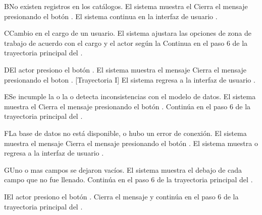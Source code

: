 \begin{UCtrayectoriaA}{B}{No existen registros en los catálogos.}
	\UCpaso     El sistema muestra el 
	\UCpaso[\UCactor] Cierra el mensaje presionando el botón .
	\UCpaso El sistema continua en la interfaz de usuario .
\end{UCtrayectoriaA}

\begin{UCtrayectoriaA}{C}{Cambio en el cargo de un usuario.}
	\UCpaso     El sistema ajustara las opciones de zona de trabajo de acuerdo con el cargo y el actor según la 
	\UCpaso     Continua en el paso 6 de la trayectoria principal del .
\end{UCtrayectoriaA}


\begin{UCtrayectoriaA}{D}{El actor presiono el botón .}
	\UCpaso El sistema muestra el mensaje 
	\UCpaso[\UCactor] Cierra el mensaje presionando el boton  . [Trayectoria I]
	\UCpaso El sistema regresa a la interfaz de usuario .
\end{UCtrayectoriaA}

\begin{UCtrayectoriaA}{E}{Se incumple la  o la   o detecta inconsistencias con el modelo de datos.}
	\UCpaso El sistema muestra el 
	\UCpaso[\UCactor] Cierra el mensaje presionando el botón .
	\UCpaso Continúa en el paso 6 de la trayectoria principal del .
\end{UCtrayectoriaA}


\begin{UCtrayectoriaA}{F}{La base de datos no está disponible, o hubo un error de conexión.}
	\UCpaso El sistema muestra el mensaje 
	\UCpaso[\UCactor] Cierra el mensaje presionando el botón .
	\UCpaso El sistema muestra o regresa a la interfaz de usuario  .
\end{UCtrayectoriaA}




\begin{UCtrayectoriaA}{G}{Uno o mas campos se dejaron vacíos.}
	\UCpaso El sistema muestra el  debajo de cada campo que no fue llenado. 
	\UCpaso	Continúa en el paso 6 de la trayectoria principal del .
\end{UCtrayectoriaA}
	\begin{UCtrayectoriaA}{I}{El actor presiono el botón .}
	\UCpaso Cierra el mensaje y continúa en el paso 6 de la trayectoria principal del .	
\end{UCtrayectoriaA}